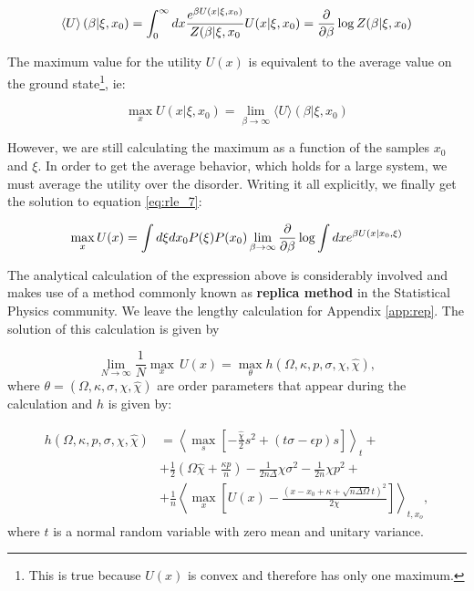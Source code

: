 \begin{equation}
  \label{eq:rle_12}
  \left \langle U \right \rangle (\beta | \xi, x_0) = \int_0^\infty dx
  \frac{e^{\beta U(x|\xi, x_0)}}{Z(\beta |\xi, x_0 } U(x|\xi, x_0) = \frac{\partial}{\partial \beta} \log Z(\beta | \xi, x_0)
\end{equation}

The maximum value for the utility $U(x)$ is equivalent to the average
value on the ground state\footnote{This is true because $U(x)$ is
  convex and therefore has only one maximum.}, ie:

\begin{equation}
  \label{eq:rle_13}
  \max_x U(x | \xi, x_0) = \lim_{\beta\to\infty} \langle U \rangle (\beta | \xi, x_0)
\end{equation}

However, we are still calculating the maximum as a function of the
samples $x_0$ and $\xi$. In order to get the average behavior, which
holds for a large system, we must average the utility over the
disorder. Writing it all explicitly, we finally get the solution
to equation \eqref{eq:rle_7}:

\begin{equation}
  \label{eq:rle_14}
  \max_x U(x) = \int d\xi dx_0 P(\xi) P(x_0)  \lim_{\beta\to\infty} \frac{\partial}{\partial \beta} \log \int dx e^{\beta U(x| x_0, \xi)}
\end{equation}
 
The analytical calculation of the expression above is considerably
involved and makes use of a method commonly known as \textbf{replica
  method} in the Statistical Physics community. We leave the lengthy calculation for Appendix \ref{app:rep}. The
solution of this calculation is given by

\begin{equation}
  \label{eq:rle_52}
  \lim_{N\to \infty} \frac{1}{N} \max_x \, U(x) = \max_\theta h(\Omega, \kappa,
  p, \sigma, \chi, \hat{\chi}),
\end{equation}
where $\theta = (\Omega, \kappa,
  \sigma, \chi, \hat{\chi})$ are order parameters that appear during
  the calculation and $h$ is given by:

\begin{align}
  \label{eq:h}
  h(\Omega, \kappa, p, \sigma, \chi, \hat{\chi})& = \left\langle
    \max_s \left[-\frac{\hat{\chi}}{2}s^2 + (t \sigma - \epsilon p)
                                                  s\right]
                                                  \right\rangle_t +
                                                  \nonumber\\ & +
  \frac{1}{2} \left(\Omega \hat{\chi} + \frac{\kappa p}{n}\right) -
  \frac{1}{2n\Delta} \chi \sigma^2 - \frac{1}{2n} \chi p^2 + \nonumber\\ &+
  \frac{1}{n} \left\langle \max_x \left[U(x) - \frac{(x - x_0 + \kappa +
      \sqrt{n\Delta\Omega}t)^2}{2\chi}\right] \right\rangle_{t,x_o},
\end{align}
where $t$ is a normal random variable with zero mean and unitary variance.

